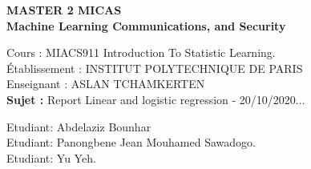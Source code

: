 \documentclass[12pt,onecolumn]{article}
\begin{document}
 
	\begin{center}
		\textbf{MASTER 2 MICAS \\[1.5cm]
		Machine Learning Communications, and Security}
		\\[1.8cm]
	\end{center}
    \begin{center}
    	Cours : MIACS911 Introduction To Statistic Learning.\\[1.5cm]
    	Établissement : INSTITUT POLYTECHNIQUE DE PARIS\\[1.5cm]
    	Enseignant : ASLAN TCHAMKERTEN\\[1.3cm]
    	\textbf{Sujet :} Report Linear and logistic regression - 20/10/2020...\\[1cm]
    \end{center}
  	\vspace{1.0cm}
	\begin{flushleft}
			Etudiant: Abdelaziz Bounhar\\
			Etudiant: Panongbene Jean Mouhamed Sawadogo.\\
			Etudiant: Yu Yeh.\\
	\end{flushleft}
\thispagestyle{empty}
\setcounter{page}{0}
\newpage
\begin{flushleft}
\end{flushleft}
\normalsize

\newpage
\end{document}
